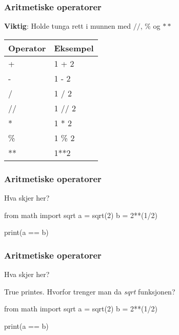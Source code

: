 
\begin{frame}
    \frametitle{Aritmetiske operatorer}

    \textbf{Viktig}: Holde tunga rett i munnen med $//$, $\%$ og $**$

\begin{table}[]
    \begin{tabular}{|l|l|}
    \hline
    Operator & Eksempel \\ \hline
    +        & 1 + 2    \\ \hline
    -        & 1 - 2    \\ \hline
    /        & 1 / 2    \\ \hline
    //       & 1 // 2   \\ \hline
    *        & 1 * 2    \\ \hline
    \%       & 1 \% 2   \\ \hline
    **       & 1**2     \\ \hline
    \end{tabular}
\end{table}    

\end{frame}



\begin{frame}[fragile]
    \frametitle{Aritmetiske operatorer}

    Hva skjer her?

\begin{python}
from math import sqrt
a = sqrt(2)
b = 2**(1/2)

print(a == b)
\end{python}

\end{frame}


\begin{frame}[fragile]
    \frametitle{Aritmetiske operatorer}

    Hva skjer her?

    True printes. Hvorfor trenger man da \textit{sqrt} funksjonen? 

\begin{python}
from math import sqrt
a = sqrt(2)
b = 2**(1/2)

print(a == b)
\end{python}

\end{frame}

